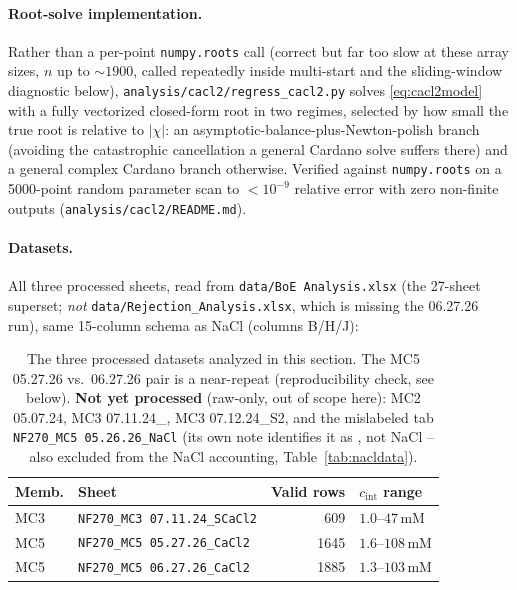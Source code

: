 \documentclass[11pt]{article}
\newcommand{\cint}{c_{\mathrm{int}}}
\begin{document}
\paragraph{Root-solve implementation.} Rather than a per-point
\texttt{numpy.roots} call (correct but far too slow at these array sizes,
$n$ up to $\sim\!1900$, called repeatedly inside multi-start and the
sliding-window diagnostic below), \texttt{analysis/cacl2/regress\_cacl2.py}
solves \eqref{eq:cacl2model} with a fully vectorized closed-form root in two
regimes, selected by how small the true root is relative to $|\chi|$: an
asymptotic-balance-plus-Newton-polish branch (avoiding the catastrophic
cancellation a general Cardano solve suffers there) and a general complex
Cardano branch otherwise. Verified against \texttt{numpy.roots} on a
5000-point random parameter scan to $<10^{-9}$ relative error with zero
non-finite outputs (\texttt{analysis/cacl2/README.md}).

\paragraph{Datasets.} All three processed  sheets, read from
\texttt{data/BoE Analysis.xlsx} (the 27-sheet superset; \emph{not}
\texttt{data/Rejection\_Analysis.xlsx}, which is missing the 06.27.26 run),
same 15-column schema as NaCl (columns B/H/J):

\begin{table}[H]
\centering\small
\begin{tabular}{llrl}
\toprule
Memb. & Sheet & Valid rows & $\cint$ range \\
\midrule
MC3 & \texttt{NF270\_MC3 07.11.24\_SCaCl2} & 609 & $1.0$--$47$\,mM \\
MC5 & \texttt{NF270\_MC5 05.27.26\_CaCl2}  & 1645 & $1.6$--$108$\,mM \\
MC5 & \texttt{NF270\_MC5 06.27.26\_CaCl2}  & 1885 & $1.3$--$103$\,mM \\
\bottomrule
\end{tabular}
\caption{The three processed  datasets analyzed in this section. The
MC5 05.27.26 vs.\ 06.27.26 pair is a near-repeat (reproducibility check, see
below). \textbf{Not yet processed} (raw-only, out of scope here): MC2
05.07.24, MC3 07.11.24\_, MC3 07.12.24\_S2, and the
mislabeled tab \texttt{NF270\_MC5 05.26.26\_NaCl} (its own note identifies it
as , not NaCl -- also excluded from the NaCl accounting,
Table~\ref{tab:nacldata}).}
\label{tab:cacl2data}
\end{table}
\end{document}
